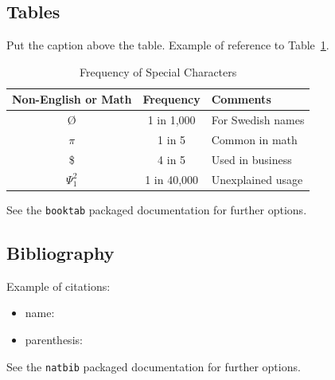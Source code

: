\documentclass{ceurart}
\begin{document}
\subsection{Tables}

Put the caption above the table. Example of reference to Table~\ref{tab:sample-table}.

\begin{table}
  \caption{Frequency of Special Characters}
  \label{tab:sample-table}
  \centering
  \begin{tabular}{|c|c|l|}
    \toprule
    Non-English or Math&Frequency&Comments\\
    \midrule
    \O & 1 in 1,000& For Swedish names\\
    $\pi$ & 1 in 5& Common in math\\
    \$ & 4 in 5 & Used in business\\
    $\Psi^2_1$ & 1 in 40,000& Unexplained usage\\
  \bottomrule
\end{tabular}
\end{table}

See the \texttt{booktab} packaged documentation for further options.

\subsection{Bibliography}

Example of citations:
\begin{itemize}
	\item name: \citet{Turing1936}
	\item parenthesis: \citep{Turing1936}
\end{itemize}

See the \texttt{natbib} packaged documentation for further options.



\end{document}

